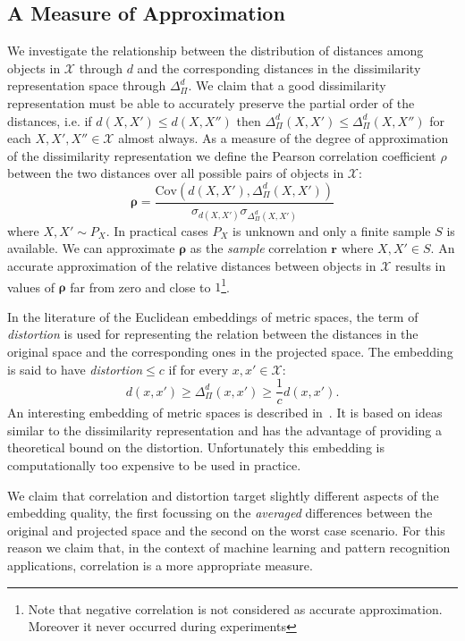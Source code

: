 \subsection{A Measure of Approximation}
\label{sec:approximation}
We investigate the relationship between the distribution of distances
among objects in $\mathcal{X}$ through $d$ and the corresponding
distances in the dissimilarity representation space through
$\Delta_{\Pi}^d$. We claim that a good dissimilarity representation
must be able to accurately preserve the partial order of the
distances, i.e. if $d(X,X') \leq d(X,X'')$ then $\Delta_{\Pi}^d(X,X')
\leq \Delta_{\Pi}^d(X,X'')$ for each $X,X',X'' \in \mathcal{X}$ almost
always. As a measure of the degree of approximation of the
dissimilarity representation we define the Pearson correlation
coefficient $\rho$ between the two distances over all possible pairs
of objects in $\mathcal{X}$:
\begin{equation}
  \label{eq:accuracy_correlation}
  \boldsymbol{\rho} = \frac{\mathrm{Cov}(d(X,X'),
    \Delta_{\Pi}^d(X,X'))}{\sigma_{d(X,X')} \sigma_{\Delta_{\Pi}^d(X,X')}}
\end{equation}
where $X,X' \sim P_X$. In practical cases $P_X$ is unknown and only a
finite sample $S$ is available. We can approximate $\boldsymbol{\rho}$
as the \emph{sample} correlation $\boldsymbol{r}$ where $X,X' \in
S$. An accurate approximation of the relative distances between
objects in $\mathcal{X}$ results in values of $\boldsymbol{\rho}$ far
from zero and close to $1$\footnote{Note that negative correlation is
  not considered as accurate approximation. Moreover it never occurred
  during experiments}.

In the literature of the Euclidean embeddings of metric spaces, the
term of \emph{distortion} is used for representing the relation
between the distances in the original space and the corresponding ones
in the projected space. The embedding is said to have
\emph{distortion}$\leq c$ if for every $x,x' \in \mathcal{X}$:
\begin{equation}
  \label{eq:distortion}
  d(x,x') \geq \Delta_{\Pi}^d(x,x') \geq \frac{1}{c} d(x,x').
\end{equation}
An interesting embedding of metric spaces is described
in~\cite{linial1995geometry}. It is based on ideas similar to the
dissimilarity representation and has the advantage of providing a
theoretical bound on the distortion. Unfortunately this embedding is
computationally too expensive to be used in practice.

We claim that correlation and distortion target slightly different
aspects of the embedding quality, the first focussing on the
\emph{averaged} differences between the original and projected space
and the second on the worst case scenario. For this reason we claim
that, in the context of machine learning and pattern recognition
applications, correlation is a more appropriate measure.


